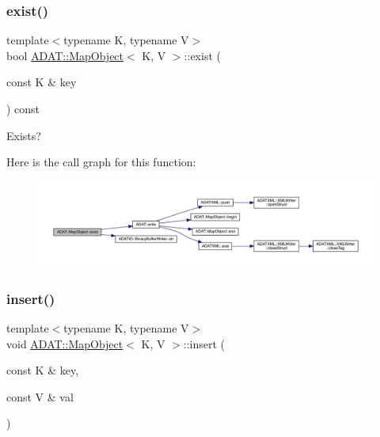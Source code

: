\subsubsection{\texorpdfstring{exist()}{exist()}\hspace{0.1cm}{\footnotesize\ttfamily [2/2]}}
{\footnotesize\ttfamily template$<$typename K, typename V$>$ \\
bool \mbox{\hyperlink{classADAT_1_1MapObject}{A\+D\+A\+T\+::\+Map\+Object}}$<$ K, V $>$\+::exist (\begin{DoxyParamCaption}\item[{const K \&}]{key }\end{DoxyParamCaption}) const\hspace{0.3cm}{\ttfamily [inline]}}



Exists? 

Here is the call graph for this function\+:
\nopagebreak
\begin{figure}[H]
\begin{center}
\leavevmode
\includegraphics[width=350pt]{da/d29/classADAT_1_1MapObject_a1d22f979e34bda97c3dc89d5fc937d3b_cgraph}
\end{center}
\end{figure}
\mbox{\label{classADAT_1_1MapObject_a5389738841dca1228aefe6935c464a78}} 
\subsubsection{\texorpdfstring{insert()}{insert()}\hspace{0.1cm}{\footnotesize\ttfamily [1/6]}}
{\footnotesize\ttfamily template$<$typename K, typename V$>$ \\
void \mbox{\hyperlink{classADAT_1_1MapObject}{A\+D\+A\+T\+::\+Map\+Object}}$<$ K, V $>$\+::insert (\begin{DoxyParamCaption}\item[{const K \&}]{key,  }\item[{const V \&}]{val }\end{DoxyParamCaption})\hspace{0.3cm}{\ttfamily [inline]}}



